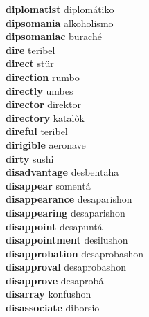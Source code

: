 \textbf{diplomatist } diplomátiko \\
\textbf{dipsomania } alkoholismo \\
\textbf{dipsomaniac } buraché \\
\textbf{dire } teribel \\
\textbf{direct } stür \\
\textbf{direction } rumbo \\
\textbf{directly } umbes \\
\textbf{director } direktor \\
\textbf{directory } katalòk \\
\textbf{direful } teribel \\
\textbf{dirigible } aeronave \\
\textbf{dirty } sushi \\
\textbf{disadvantage } desbentaha \\
\textbf{disappear } somentá \\
\textbf{disappearance } desaparishon \\
\textbf{disappearing } desaparishon \\
\textbf{disappoint } desapuntá \\
\textbf{disappointment } desilushon \\
\textbf{disapprobation } desaprobashon \\
\textbf{disapproval } desaprobashon \\
\textbf{disapprove } desaprobá \\
\textbf{disarray } konfushon \\
\textbf{disassociate } diborsio \\
